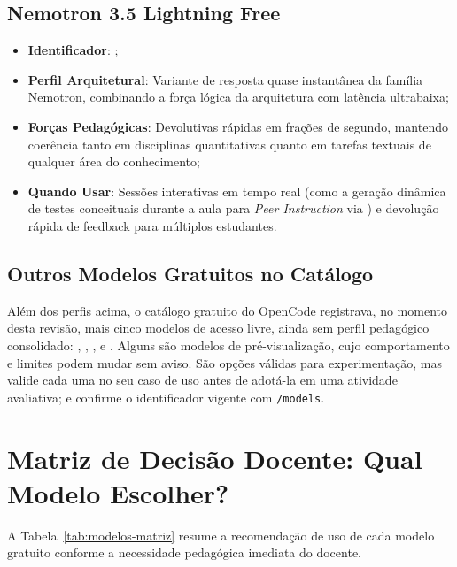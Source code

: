 \subsection{Nemotron 3.5 Lightning Free}

\begin{itemize}
  \item \textbf{Identificador}: ;
  \item \textbf{Perfil Arquitetural}: Variante de resposta quase instant{\^a}nea da fam{\'i}lia Nemotron, combinando a for{\c c}a l{\'o}gica da arquitetura com lat{\^e}ncia ultrabaixa;
   \item \textbf{For{\c c}as Pedag{\'o}gicas}: Devolutivas r{\'a}pidas em fra{\c c}{\~o}es de segundo, mantendo coer{\^e}ncia tanto em disciplinas quantitativas quanto em tarefas textuais de qualquer {\'a}rea do conhecimento;
   \item \textbf{Quando Usar}: Sess{\~o}es interativas em tempo real (como a gera{\c c}{\~a}o din{\^a}mica de testes conceituais durante a aula para \emph{Peer Instruction} via ) e devolu{\c c}{\~a}o r{\'a}pida de feedback para m{\'u}ltiplos estudantes.
\end{itemize}

\subsection{Outros Modelos Gratuitos no Cat{\'a}logo}

Al{\'e}m dos perfis acima, o cat{\'a}logo gratuito do OpenCode registrava, no momento desta revis{\~a}o, mais cinco modelos de acesso livre, ainda sem perfil pedag{\'o}gico consolidado: , , ,  e . Alguns s{\~a}o modelos de pr{\'e}-visualiza{\c c}{\~a}o, cujo comportamento e limites podem mudar sem aviso. S{\~a}o op{\c c}{\~o}es v{\'a}lidas para experimenta{\c c}{\~a}o, mas valide cada uma no seu caso de uso antes de adot{\'a}-la em uma atividade avaliativa; e confirme o identificador vigente com \texttt{/models}.

\section{Matriz de Decis{\~a}o Docente: Qual Modelo Escolher?}

A Tabela~\ref{tab:modelos-matriz} resume a recomenda{\c c}{\~a}o de uso de cada modelo gratuito conforme a necessidade pedag{\'o}gica imediata do docente.

